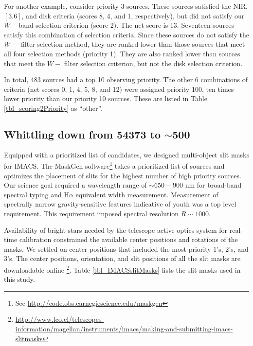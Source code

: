 For another example, consider priority 3 sources.  These sources satisfied the NIR, $[3.6]$, and disk criteria (scores 8, 4, and 1, respectively), but did not satisfy our $W-$band selection criterion (score 2).  The net score is 13.  Seventeen sources satisfy this combination of selection criteria.  Since these sources do not satisfy the $W-$ filter selection method, they are ranked lower than those sources that meet all four selection methods (priority 1).  They are also ranked lower than sources that meet the $W-$ filter selection criterion, but not the disk selection criterion.

In total, 483 sources had a top 10 observing priority.  The other 6 combinations of criteria (net scores 0, 1, 4, 5, 8, and 12) were assigned priority 100, ten times lower priority than our priority 10 sources.  These are listed in Table \ref{tbl_scoring2Priority} as ``other''.



\subsection{Whittling down from 54373 to $\sim$500}
Equipped with a prioritized list of candidates, we designed multi-object slit masks for IMACS.  The MaskGen software\footnote{See \url{ http://code.obs.carnegiescience.edu/maskgen}} takes a prioritized list of sources and optimizes the placement of slits for the highest number of high priority sources.  Our science goal required a wavelength range of $\sim 650-900$ nm for broad-band spectral typing and H$\alpha$ equivalent width measurement.  Measurement of spectrally narrow gravity-sensitive features indicative of youth \citep{1999ApJ...525..466L,2007AJ....134.2398C,2009AJ....137.3345C} was a top level requirement.  This requirement imposed spectral resolution $R\sim1000$.

Availability of bright stars needed by the telescope active optics system for real-time calibration constrained the available center positions and rotations of the masks.  We settled on center positions that included the most priority 1's, 2's, and 3's.  The center positions, orientation, and slit positions of all the slit masks are downloadable online \footnote{\url{http://www.lco.cl/telescopes-information/magellan/instruments/imacs/making-and-submitting-imacs-slitmasks}}.  Table \ref{tbl_IMACSslitMasks} lists the slit masks used in this study.




